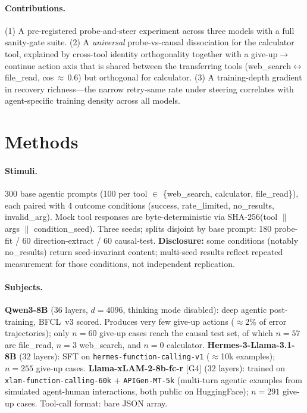 \documentclass{article}
\begin{document}
\paragraph{Contributions.}
(1) A pre-registered probe-and-steer experiment across three models
with a full sanity-gate suite.
(2) A \emph{universal} probe-vs-causal dissociation for the calculator
tool, explained by cross-tool identity orthogonality together with a
give-up$\to$continue action axis that is shared between the transferring
tools (web\_search$\leftrightarrow$file\_read, cos\,$\approx$\,0.6) but
orthogonal for calculator.
(3) A training-depth gradient in recovery richness---the narrow
retry-same rate under steering correlates with agent-specific training
density across all models.

\section{Methods}
\label{sec:methods}

\paragraph{Stimuli.}
300 base agentic prompts (100 per tool $\in$ \{web\_search,
calculator, file\_read\}), each paired with 4 outcome conditions
(success, rate\_limited, no\_results, invalid\_arg).
Mock tool responses are byte-deterministic via SHA-256(tool $\|$
args $\|$ condition\_seed).  Three seeds; splits disjoint by
base prompt: 180 probe-fit / 60 direction-extract / 60 causal-test.
\textbf{Disclosure:} some conditions (notably no\_results) return
seed-invariant content; multi-seed results reflect repeated
measurement for those conditions, not independent replication.

\paragraph{Subjects.}
\textbf{Qwen3-8B} (36 layers, $d{=}4096$, thinking mode disabled):
deep agentic post-training, BFCL~v3 scored.
Produces very few give-up actions ($\approx$2\% of error trajectories);
only $n{=}60$ give-up cases reach the causal test set, of which $n{=}57$
are file\_read, $n{=}3$ web\_search, and $n{=}0$ calculator.
\textbf{Hermes-3-Llama-3.1-8B} (32 layers): SFT on
\texttt{hermes-function-calling-v1} ($\approx$10k examples);
$n{=}255$ give-up cases.
\textbf{Llama-xLAM-2-8b-fc-r} [G4] (32 layers): trained on
\texttt{xlam-function-calling-60k} + \texttt{APIGen-MT-5k} (multi-turn
agentic examples from simulated agent-human interactions, both public
on HuggingFace); $n{=}291$ give-up cases.
Tool-call format: bare JSON array.
\end{document}
